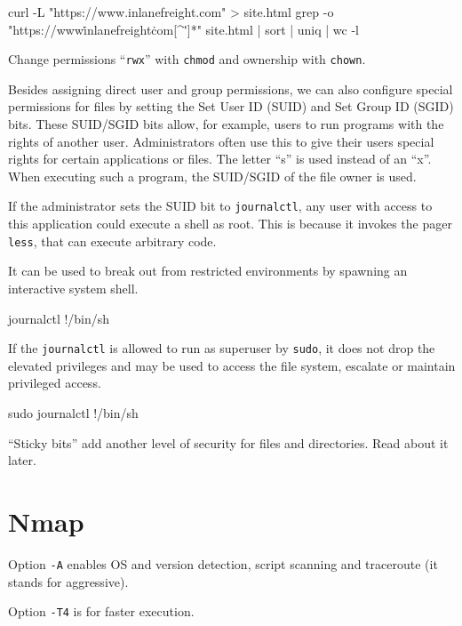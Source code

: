\documentclass[a4paper,10pt]{article}
\begin{document}
\begin{bash}
curl -L "https://www.inlanefreight.com" > site.html
grep -o "https\?://www\.inlanefreight\.com[^\"']*" site.html |
sort | uniq | wc -l
\end{bash}

Change permissions ``\texttt{rwx}'' with \texttt{chmod} and ownership with \texttt{chown}.

\n

Besides assigning direct user and group permissions, we can also configure special permissions for files by setting the Set User ID (SUID) and Set Group ID (SGID) bits. These SUID/SGID bits allow, for example, users to run programs with the rights of another user. Administrators often use this to give their users special rights for certain applications or files. The letter ``s'' is used instead of an ``x''. When executing such a program, the SUID/SGID of the file owner is used.

\n
If the administrator sets the SUID bit to \texttt{journalctl}, any user with access to this application could execute a shell as root. This is because it invokes the pager \texttt{less}, that can execute arbitrary code.

It can be used to break out from restricted environments by spawning an interactive system shell.
\begin{bash}
journalctl
!/bin/sh
\end{bash}

If the \texttt{journalctl} is allowed to run as superuser by \texttt{sudo}, it does not drop the elevated privileges and may be used to access the file system, escalate or maintain privileged access.
\begin{bash}
sudo journalctl
!/bin/sh
\end{bash}

``Sticky bits'' add another level of security for files and directories. Read about it later.



\pagebreak

\section{Nmap}

Option \texttt{-A} enables OS and version detection, script scanning and traceroute (it stands for aggressive).

\n

Option \texttt{-T4} is for faster execution.
\end{document}
